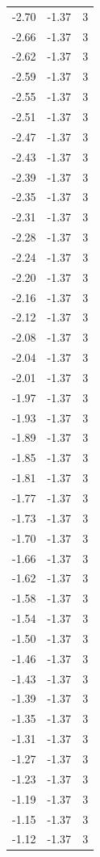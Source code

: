 \begin{longtable}{lrr}
  -2.70 & -1.37 & 3 \\
  -2.66 & -1.37 & 3 \\
  -2.62 & -1.37 & 3 \\
  -2.59 & -1.37 & 3 \\
  -2.55 & -1.37 & 3 \\
  -2.51 & -1.37 & 3 \\
  -2.47 & -1.37 & 3 \\
  -2.43 & -1.37 & 3 \\
  -2.39 & -1.37 & 3 \\
  -2.35 & -1.37 & 3 \\
  -2.31 & -1.37 & 3 \\
  -2.28 & -1.37 & 3 \\
  -2.24 & -1.37 & 3 \\
  -2.20 & -1.37 & 3 \\
  -2.16 & -1.37 & 3 \\
  -2.12 & -1.37 & 3 \\
  -2.08 & -1.37 & 3 \\
  -2.04 & -1.37 & 3 \\
  -2.01 & -1.37 & 3 \\
  -1.97 & -1.37 & 3 \\
  -1.93 & -1.37 & 3 \\
  -1.89 & -1.37 & 3 \\
  -1.85 & -1.37 & 3 \\
  -1.81 & -1.37 & 3 \\
  -1.77 & -1.37 & 3 \\
  -1.73 & -1.37 & 3 \\
  -1.70 & -1.37 & 3 \\
  -1.66 & -1.37 & 3 \\
  -1.62 & -1.37 & 3 \\
  -1.58 & -1.37 & 3 \\
  -1.54 & -1.37 & 3 \\
  -1.50 & -1.37 & 3 \\
  -1.46 & -1.37 & 3 \\
  -1.43 & -1.37 & 3 \\
  -1.39 & -1.37 & 3 \\
  -1.35 & -1.37 & 3 \\
  -1.31 & -1.37 & 3 \\
  -1.27 & -1.37 & 3 \\
  -1.23 & -1.37 & 3 \\
  -1.19 & -1.37 & 3 \\
  -1.15 & -1.37 & 3 \\
  -1.12 & -1.37 & 3 \\

\end{longtable}
